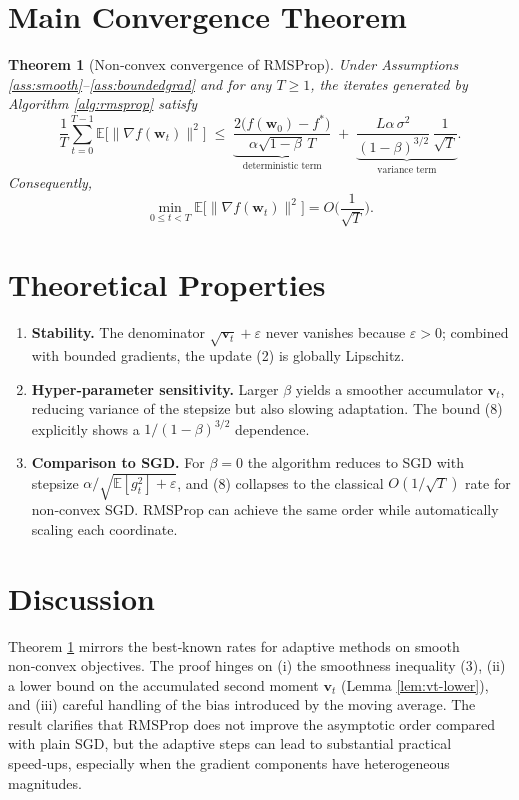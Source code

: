 \documentclass{article}
\newtheorem{theorem}{Theorem}
\newcommand{\EE}{\mathbb{E}}
\begin{document}
\section*{Main Convergence Theorem}
\begin{theorem}[Non‑convex convergence of RMSProp]\label{thm:main}
Under Assumptions \ref{ass:smooth}–\ref{ass:boundedgrad} and for any $T\ge1$, the iterates generated by Algorithm \ref{alg:rmsprop} satisfy
\[
\frac{1}{T}\sum_{t=0}^{T-1}\EE\!\big[\|\nabla f(\bm w_{t})\|^{2}\big]
\;\le\;
\underbrace{\frac{2\big(f(\bm w_{0})-f^{*}\big)}{\alpha\sqrt{1-\beta}\,T}}_{\text{deterministic term}}
\;+\;
\underbrace{\frac{L\alpha\,\sigma^{2}}{(1-\beta)^{3/2}}\,\frac{1}{\sqrt{T}}}_{\text{variance term}} .
\tag{8}
\]
Consequently,
\[
\min_{0\le t<T}\EE\!\big[\|\nabla f(\bm w_{t})\|^{2}\big]=O\!\Big(\frac{1}{\sqrt{T}}\Big).
\]
\end{theorem}

\section*{Theoretical Properties}
\begin{enumerate}[label=\arabic*.]
\item \textbf{Stability.} The denominator $\sqrt{\bm v_{t}}+\varepsilon$ never vanishes because $\varepsilon>0$; combined with bounded gradients, the update (2) is globally Lipschitz.
\item \textbf{Hyper‑parameter sensitivity.} Larger $\beta$ yields a smoother accumulator $\bm v_{t}$, reducing variance of the stepsize but also slowing adaptation. The bound (8) explicitly shows a $1/(1-\beta)^{3/2}$ dependence.
\item \textbf{Comparison to SGD.} For $\beta=0$ the algorithm reduces to SGD with stepsize $\alpha/\sqrt{\EE[g_{t}^{2}]+\varepsilon}$, and (8) collapses to the classical $O(1/\sqrt{T})$ rate for non‑convex SGD. RMSProp can achieve the same order while automatically scaling each coordinate.
\end{enumerate}

\section*{Discussion}
Theorem \ref{thm:main} mirrors the best‑known rates for adaptive methods on smooth non‑convex objectives. The proof hinges on (i) the smoothness inequality (3), (ii) a lower bound on the accumulated second moment $\bm v_{t}$ (Lemma \ref{lem:vt-lower}), and (iii) careful handling of the bias introduced by the moving average. The result clarifies that RMSProp does not improve the asymptotic order compared with plain SGD, but the adaptive steps can lead to substantial practical speed‑ups, especially when the gradient components have heterogeneous magnitudes.
\end{document}
